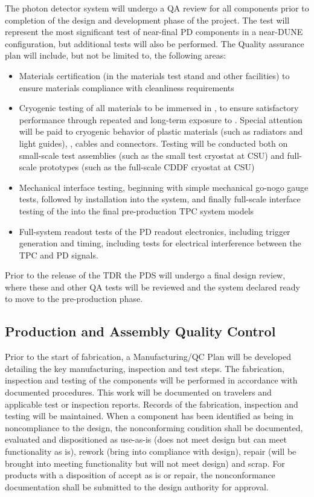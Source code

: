 The photon detector system will undergo a QA review for all components prior to completion of the design and development phase of the project.  The  test will represent the most significant test of near-final PD components in a near-DUNE configuration, but additional tests will also be performed.  The Quality assurance plan will include, but not be limited to, the following areas:

\begin{itemize}
\item Materials certification (in the  materials test stand and other facilities) to ensure materials compliance with cleanliness requirements
\item Cryogenic testing of all materials to be immersed in \lar, to ensure satisfactory performance through repeated and long-term exposure to \lar.  Special attention will be paid to cryogenic behavior of plastic materials (such as radiators and light guides), , cables and connectors.  Testing will be conducted both on small-scale test assemblies (such as the small test cryostat at CSU) and full-scale prototypes (such as the full-scale CDDF cryostat at CSU) 
\item Mechanical interface testing, beginning with simple mechanical go-nogo gauge tests, followed by installation into the  system, and finally full-scale interface testing of the  into the final pre-production TPC system models
\item Full-system readout tests of the PD readout electronics, including trigger generation and timing, including tests for electrical interference between the TPC and PD signals.
\end{itemize}

Prior to the release of the TDR the PDS will undergo a final design review, where these and other QA tests will be reviewed and the system declared ready to move to the pre-production phase.


\subsection{Production and Assembly Quality Control}
\label{sec:fdsp-pd-prodqc}

Prior to the start of fabrication, a Manufacturing/QC Plan will be developed detailing the key manufacturing, inspection and test steps.  The fabrication, inspection and testing of the components will be performed in accordance with documented procedures. This work will be documented on travelers and applicable test or inspection reports. Records of the fabrication, inspection and testing will be maintained. When a component has been identified as being in noncompliance to the design, the nonconforming condition shall be documented, evaluated and dispositioned as use-as-is (does not meet design but can meet functionality as is), rework (bring into compliance with design), repair (will be brought into meeting functionality but will not meet design) and scrap. For products with a disposition of accept as is or repair, the nonconformance documentation shall be submitted to the design authority for approval.   


